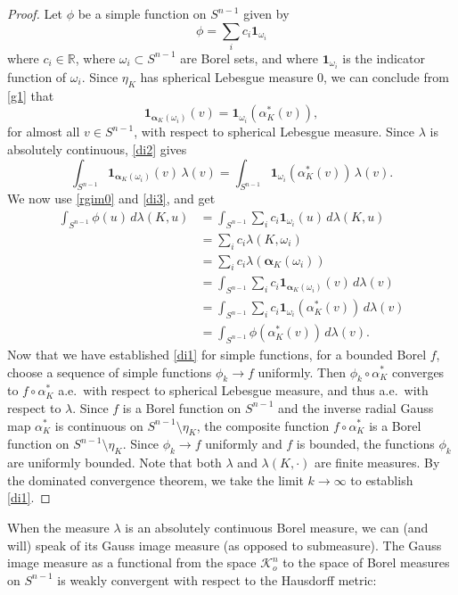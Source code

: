 \documentclass{cpamart1}     %
\theoremstyle{definition}
\theoremstyle{remark}
\newcommand{\sn}{S^{n-1}}
\newcommand{\kno}{\mathcal K^n_o}
\newcommand{\balpha}{\pmb{\alpha}}
\newcommand{\chara}[1]{{\mathbf{1}_{#1}}}
\begin{document}
\begin{proof}
Let $\phi$ be a simple function on $\sn$ given by
\[
\phi= \sum_i c_i \chara{\omega_i}
\]
where $c_i\in\mathbb R$, where $\omega_i\subset\sn$ are Borel sets, and where $\chara{\omega_i}$ is the indicator function of $\omega_i$.
Since $\eta_K$ has spherical Lebesgue measure $0$, we can conclude from \eqref{g1} that
\begin{equation}\label{di2}
\chara{\balpha_K(\omega_i)}(v)=\chara{\omega_i}(\alpha_K^*(v)),
\end{equation}
for almost all $v\in \sn$, with respect to spherical Lebesgue measure.
Since $\lambda$ is absolutely continuous,
\eqref{di2} gives
\begin{equation}\label{di3}
\int_{\sn} \chara{\balpha_K(\omega_i)}(v)\, \lambda(v)
=\int_{\sn} \chara{\omega_i}(\alpha_K^*(v))\, \lambda(v).
\end{equation}
We now use \eqref{rgim0} and \eqref{di3}, and get
\begin{align*}
\int_{\sn} \phi(u)\, d\lambda(K,u)
&=\int_{\sn} \sum_i c_i \chara{\omega_i}(u) \, d\lambda(K,u)\\
&=\sum_i c_i \lambda(K,\omega_i)\\
&=\sum_i c_i \lambda(\balpha_K(\omega_i))\\
&= \int_{\sn} \sum_i c_i \chara{\balpha_K(\omega_i)}(v) \, d\lambda(v) \\
&=\int_{\sn} \sum_i c_i \chara{\omega_i}(\alpha_K^*(v)) \, d\lambda(v) \\
&= \int_{\sn} \phi(\alpha_K^*(v)) \, d\lambda(v).
\end{align*}
Now that we have established \eqref{di1} for simple functions, for a bounded Borel $f$,
choose a sequence of simple functions $\phi_k \to f$ uniformly.
Then $\phi_k\circ \alpha_K^*$  converges
to $f\circ \alpha_K^*$ a.e.\ with respect to spherical Lebesgue measure, and thus a.e.\
with respect to $\lambda$.
Since $f$ is a Borel function on $\sn$ and the inverse radial Gauss map $\alpha_K^*$
is continuous on $\sn\setminus \eta_K$, the composite function $f\circ \alpha_K^*$
is a Borel function on $\sn\setminus \eta_K$. Since $\phi_k\to f$ uniformly and $f$ is bounded, the functions $\phi_k$ are uniformly bounded. Note that both $\lambda$ and $\lambda(K,\cdot)$ are finite measures. By the dominated convergence theorem, we take the limit $k\to \infty$ to establish \eqref{di1}.
\end{proof}

When the measure $\lambda$ is an absolutely continuous Borel measure, we can (and will) speak of its
Gauss image measure (as opposed to submeasure). 
The Gauss image measure as a functional from the space $\kno$ to the space of
Borel measures on $\sn$ is weakly convergent with respect to the Hausdorff metric:
\end{document}
